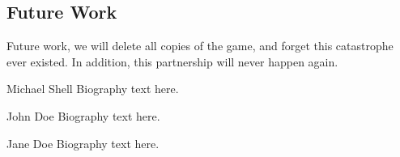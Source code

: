 \documentclass[10pt,conference,onecolumn,compsoc]{IEEEtran}
\begin{document}
\subsection{Future Work}
Future work, we will delete all copies of the game, and forget this catastrophe ever existed. In addition, this partnership will never happen again.







\begin{IEEEbiography}{Michael Shell}
Biography text here.
\end{IEEEbiography}

\begin{IEEEbiographynophoto}{John Doe}
Biography text here.
\end{IEEEbiographynophoto}


\begin{IEEEbiographynophoto}{Jane Doe}
Biography text here.
\end{IEEEbiographynophoto}





\end{document}
